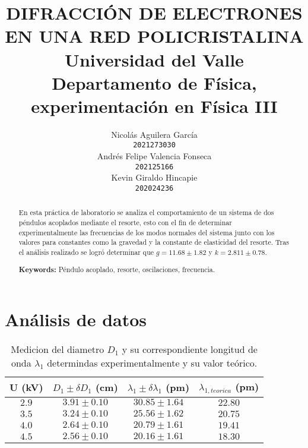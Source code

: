 \documentclass[10pt]{article}
\title{
    DIFRACCIÓN DE ELECTRONES EN UNA RED POLICRISTALINA\\
    Universidad del Valle \\
    Departamento de Física, experimentación en Física III
}
\author{
    Nicolás Aguilera García \\
    {\tt 2021273030} \\
    \And
    Andrés Felipe Valencia Fonseca \\
    {\tt 202125166} \\
    \And
    Kevin Giraldo Hincapie\\
    {\tt 202024236} \\
}
\date{}
\begin{document}
    \maketitle

    \begin{abstract}
        En esta práctica de laboratorio se analiza el comportamiento de un sistema de dos péndulos acoplados mediante el resorte, esto con el fin de determinar experimentalmente las frecuencias de los modos normales del sistema junto con los valores para constantes como la gravedad y la constante de elasticidad del resorte. Tras el análisis realizado se logró determinar que $g = 11.68 \pm 1.82$ y $k = 2.811 \pm 0.78$.

            {\bf Keywords: } Péndulo acoplado, resorte, oscilaciones, frecuencia.
    \end{abstract}

    \section{Análisis de datos}
        
    \begin{table}[H]
        \centering
        \resizebox{3.4in}{!} {
            \begin{tabular}{cccc}
                \hline
                \multicolumn{1}{l|}{U (kV)} & \multicolumn{1}{l|}{$D_1 \pm \delta D_1$ (cm)}    & \multicolumn{1}{l|}{$\lambda_1 \pm \delta \lambda_1 $ (pm)}   & $\lambda_{1,teorica}$ (pm) \\ \hline
                $2.9$                       & $3.91 \pm 0.10$                                           & $30.85 \pm 1.64$                                                       & $ 22.80 $                      \\
                $3.5$                       & $3.24 \pm 0.10$                                           & $25.56 \pm 1.62$                                                       & $ 20.75 $                      \\
                $4.0$                       & $2.64 \pm 0.10$                                           & $20.79 \pm 1.61$                                                       & $ 19.41 $                      \\
                $4.5$                       & $2.56 \pm 0.10$                                           & $20.16 \pm 1.61$                                                       & $ 18.30 $                      \\ \hline
            \end{tabular}
        }
        \label{tab:datosD1}
        \caption{Medicion del diametro $D_1$ y su correspondiente longitud de onda $\lambda_1$ determindas experimentalmente y su valor teórico.}
    \end{table}
\end{document}
